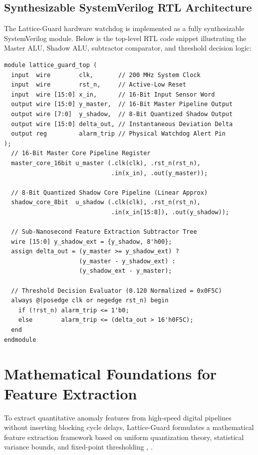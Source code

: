 \documentclass[conference]{IEEEtran}
\begin{document}
\subsection{Synthesizable SystemVerilog RTL Architecture}
The Lattice-Guard hardware watchdog is implemented as a fully synthesizable SystemVerilog module. Below is the top-level RTL code snippet illustrating the Master ALU, Shadow ALU, subtractor comparator, and threshold decision logic:

\begin{verbatim}
module lattice_guard_top (
  input  wire        clk,       // 200 MHz System Clock
  input  wire        rst_n,     // Active-Low Reset
  input  wire [15:0] x_in,      // 16-Bit Input Sensor Word
  output wire [15:0] y_master,  // 16-Bit Master Pipeline Output
  output wire [7:0]  y_shadow,  // 8-Bit Quantized Shadow Output
  output wire [15:0] delta_out, // Instantaneous Deviation Delta
  output reg         alarm_trip // Physical Watchdog Alert Pin
);
  // 16-Bit Master Core Pipeline Register
  master_core_16bit u_master (.clk(clk), .rst_n(rst_n), 
                              .in(x_in), .out(y_master));
  
  // 8-Bit Quantized Shadow Core Pipeline (Linear Approx)
  shadow_core_8bit  u_shadow (.clk(clk), .rst_n(rst_n), 
                              .in(x_in[15:8]), .out(y_shadow));
  
  // Sub-Nanosecond Feature Extraction Subtractor Tree
  wire [15:0] y_shadow_ext = {y_shadow, 8'h00};
  assign delta_out = (y_master >= y_shadow_ext) ? 
                     (y_master - y_shadow_ext) : 
                     (y_shadow_ext - y_master);
  
  // Threshold Decision Evaluator (0.120 Normalized = 0x0F5C)
  always @(posedge clk or negedge rst_n) begin
    if (!rst_n) alarm_trip <= 1'b0;
    else        alarm_trip <= (delta_out > 16'h0F5C);
  end
endmodule
\end{verbatim}

\section{Mathematical Foundations for Feature Extraction}
To extract quantitative anomaly features from high-speed digital pipelines without inserting blocking cycle delays, Lattice-Guard formulates a mathematical feature extraction framework based on uniform quantization theory, statistical variance bounds, and fixed-point thresholding \cite{ieee1800}, \cite{iso26262}.
\end{document}
